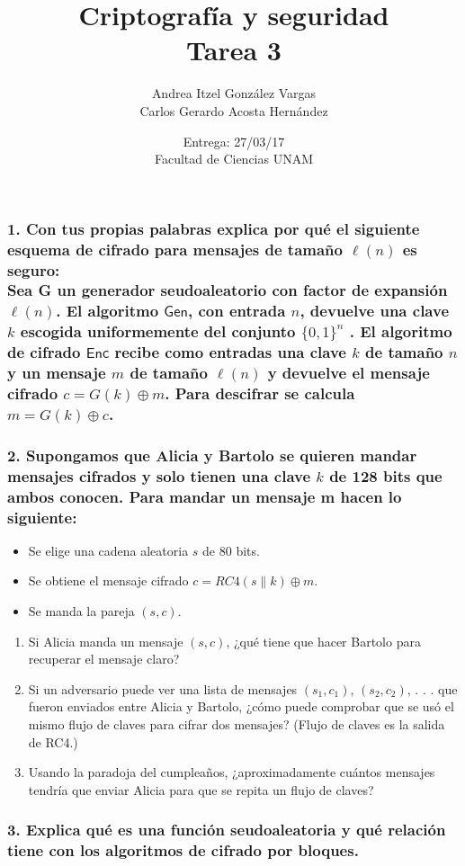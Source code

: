 \documentclass[12pt]{article}
\title{Criptografía y seguridad \\ Tarea 3}
\author{Andrea Itzel González Vargas \\ Carlos Gerardo Acosta Hernández}
\date{Entrega: 27/03/17 \\ Facultad de Ciencias UNAM}
\begin{document}
\maketitle
\subsubsection*{1. Con tus propias palabras explica por qué el siguiente esquema de cifrado para mensajes de tamaño $\ell(n)$ es seguro: \\
Sea G un generador seudoaleatorio con factor de expansión $\ell (n)$. El algoritmo $\textsf{Gen}$, con entrada $n$, devuelve una clave $k$ escogida uniformemente del conjunto $\{0, 1\}^n$ . El algoritmo de cifrado $\textsf{Enc}$ recibe como entradas una clave $k$ de tamaño $n$ y un mensaje $m$ de tamaño $\ell (n)$ y devuelve el mensaje cifrado $c = G(k) \oplus m$. Para descifrar se calcula $m = G(k) \oplus c$.}


\subsubsection*{2. Supongamos que Alicia y Bartolo se quieren mandar mensajes cifrados y solo tienen una clave $k$ de 128 bits que ambos conocen. Para mandar un mensaje m hacen lo siguiente:}
\begin{itemize}
\item Se elige una cadena aleatoria $s$ de 80 bits.
\item Se obtiene el mensaje cifrado $c = RC4(s \parallel k) \oplus m$.
\item Se manda la pareja $(s, c)$.
\end{itemize}
\begin{enumerate}[label=\alph*)]
\item Si Alicia manda un mensaje $(s, c)$, ¿qué tiene que hacer Bartolo para recuperar el mensaje claro?
\item Si un adversario puede ver una lista de mensajes $(s_1, c_1)$, $(s_2, c_2)$, . . . que fueron enviados entre Alicia y Bartolo, ¿cómo puede comprobar que se usó el mismo flujo de claves para cifrar dos mensajes? (Flujo de claves es la salida de RC4.)
\item Usando la paradoja del cumpleaños, ¿aproximadamente cuántos mensajes tendría que enviar Alicia para que se repita un flujo de claves?
\end{enumerate}


\subsubsection*{3. Explica qué es una función seudoaleatoria y qué relación tiene con los algoritmos de cifrado por bloques.}
\end{document}
